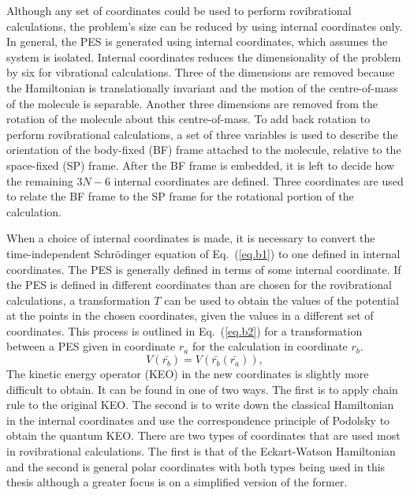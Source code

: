 Although any set of coordinates could be used to perform rovibrational calculations, the problem's size can be reduced by using internal coordinates only.  In general, the PES is generated using internal coordinates, which assumes the system is isolated.  Internal coordinates reduces the dimensionality of the problem by six for vibrational calculations.  Three of the dimensions are removed because the Hamiltonian is translationally invariant and the motion of the centre-of-mass of the molecule is separable.  Another three dimensions are removed from the rotation of the molecule about this centre-of-mass. To add back rotation to perform rovibrational calculations, a set of three variables is used to describe the orientation of the  body-fixed (BF) frame attached to the molecule, relative to the space-fixed (SP) frame.  After the BF frame is embedded, it is left to decide how the remaining $3N-6$ internal coordinates are defined.  Three coordinates are used to relate the BF frame to the SP frame for the rotational portion of the calculation. 

When a choice of internal coordinates is made, it is necessary to convert the time-independent Schr\"{o}dinger equation of Eq.~(\ref{eq.b1}) to one defined in internal coordinates.  The PES is generally defined in terms of some internal coordinate.   If the PES is defined in different coordinates than are chosen for the rovibrational calculations, a transformation $T$ can be used to obtain the values of the potential at the points in the chosen coordinates, given the values in a different set of coordinates.  This process is outlined in Eq.~(\ref{eq.b2}) for a transformation between a PES given in coordinate $r_a$ for the calculation in coordinate $r_b$.
\begin{equation}
\label{eq.b2}
V\left(\bar{r_b}\right)=V\left(\bar{r_b} \left(\bar{r_a}\right)\right),
\end{equation}
The kinetic energy operator (KEO) in the new coordinates is slightly more difficult to obtain.  It can be found in one of two ways.  The first is to apply chain rule to the original KEO.  The second is to write down the classical Hamiltonian in the internal coordinates and use the correspondence principle of Podolsky\cite{Podolsky1928} to obtain the quantum KEO.  There are two types of coordinates that are used most in rovibrational calculations.  The first is that of the Eckart-Watson Hamiltonian and the second is general polar coordinates with both types being used in this thesis although a greater focus is on a simplified version of the former.


